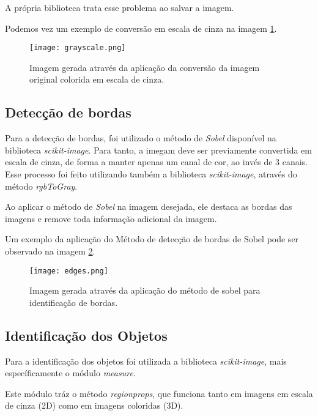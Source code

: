 \documentclass[conference]{IEEEtran}
\begin{document}
        A própria biblioteca trata esse problema ao salvar a imagem.

        Podemos vez um exemplo de conversão em escala de cinza na imagem \ref{cinza}.

        \begin{figure}[ht]
            \centering
            \texttt{[image: grayscale.png]}
            \caption{Imagem gerada através da aplicação da conversão da imagem original colorida em escala de cinza.}
            \label{cinza}
        \end{figure}

    \subsection{Detecção de bordas}

        Para a detecção de bordas, foi utilizado o método de \textit{Sobel} disponível na biblioteca \textit{scikit-image}.
        Para tanto, a imegam deve ser previamente convertida em escala de cinza, de forma a manter apenas um canal de cor, ao invés de 3 canais. Esse processo foi feito utilizando também a biblioteca \textit{scikit-image}, através do método \textit{rgbToGray}.

        Ao aplicar o método de \textit{Sobel} na imagem desejada, ele destaca as bordas das imagens e remove toda informação adicional da imagem.

        Um exemplo da aplicação do Método de detecção de bordas de Sobel pode ser observado na imagem \ref{sobel}.

        \begin{figure}[ht]
            \centering
            \texttt{[image: edges.png]}
            \caption{Imagem gerada através da aplicação do método de sobel para identificação de bordas.}
            \label{sobel}
        \end{figure}

    \subsection{Identificação dos Objetos}

        Para a identificação dos objetos foi utilizada a biblioteca \textit{scikit-image}, mais específicamente o módulo \textit{measure}.

        Este módulo tráz o método \textit{regionprops}, que funciona tanto em imagens em escala de cinza (2D) como em imagens coloridas (3D).
\end{document}
